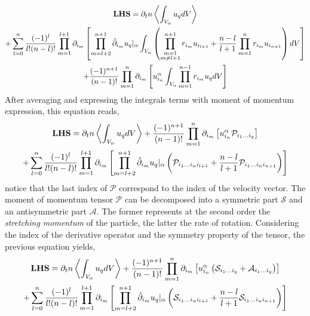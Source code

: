 {%
\begin{multline*}
    \textbf{LHS}
    = \partial_t n \left<\int_{V_\alpha} u_q dV\right>\\
    + 
    \sum_{l=0}^n
    \frac{(-1)^l}{l!(n-l)!} \prod_{m=1}^{l+1} \partial_{i_m}
    \left[
    \prod_{m=l+2}^{n+1} \hat{\partial}_{i_m} u_q|_\alpha
    \int_{V_\alpha} 
    \left(
        \prod_{\substack{m=1 \\ m \neq l+1}}^{n+1} r_{i_m}
        u_{i_{l+1}} 
        +\frac{n-l}{l+1}  
        \prod_{m=1}^{n}
        r_{i_m} u_{i_{n+1}}
    \right) dV
    \right]\\
    + \frac{(-1)^{n+1}}{(n-1)!} \prod_{m=1}^{n} \partial_{i_m}
    \left[
        u_{i_n}^\alpha \int_{V_\alpha}  
        \prod_{m=1}^{n-1} r_{i_m} u_q dV
    \right]
\end{multline*}
After averaging and expressing the integrals terms with moment of momentum expression, this equation reads,
\begin{multline*}
    \textbf{LHS}
    = \partial_t n \left<\int_{V_\alpha} u_q dV\right>
    + \frac{(-1)^{n+1}}{(n-1)!} \prod_{m=1}^{n} \partial_{i_m}
    \left[
        u_{i_n}^\alpha   
        \mathcal{P}_{i_1 \ldots i_q}
    \right]\\
    + 
    \sum_{l=0}^n
    \frac{(-1)^l}{l!(n-l)!} \prod_{m=1}^{l+1} \partial_{i_m}
    \left[
    \prod_{m=l+2}^{n+1} \hat{\partial}_{i_m} u_q|_\alpha
    \left(
        \mathcal{P}_{i_1 \ldots i_n i_{l+1}}
        +\frac{n-l}{l+1}  
        \mathcal{P}_{i_1 \ldots i_n i_{n+1}}
    \right) 
    \right]
\end{multline*}
notice that the last index of $\mathcal{P}$ correspond to the index of the velocity vector.
The moment of momentum tensor $\mathcal{P}$ can be decomposed into a symmetric part $\mathcal{S}$ and an antisymmetric part $\mathcal{A}$.
The former represents at the second order the \textit{stretching momentum} of the particle, the latter the rate of rotation.
Considering the index of the derivative operator and the symmetry property of the tensor, the previous equation yields, 
\begin{multline*}
    \textbf{LHS}
    = \partial_t n \left<\int_{V_\alpha} u_q dV\right>
    + \frac{(-1)^{n+1}}{(n-1)!} \prod_{m=1}^{n} \partial_{i_m}
    \left[
        u_{i_n}^\alpha   
        \left(
            \mathcal{S}_{i_1 \ldots i_q}
            +\mathcal{A}_{i_1 \ldots i_q}
        \right)
    \right]\\
    + 
    \sum_{l=0}^n
    \frac{(-1)^l}{l!(n-l)!} \prod_{m=1}^{l+1} \partial_{i_m}
    \left[
    \prod_{m=l+2}^{n+1} \hat{\partial}_{i_m} u_q|_\alpha
    \left(
        \mathcal{S}_{i_1 \ldots i_n i_{l+1}}
        +\frac{n-l}{l+1}  
        \mathcal{S}_{i_1 \ldots i_n i_{n+1}}
    \right) 
    \right]
\end{multline*}

}
